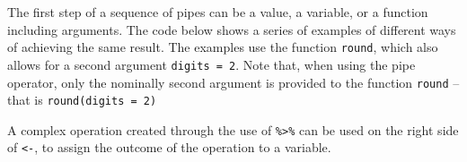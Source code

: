 \documentclass[
]{book}
\newenvironment{Shaded}{\begin{snugshade}}{\end{snugshade}}
\newcommand{\CommentTok}[1]{\textcolor[rgb]{0.56,0.35,0.01}{\textit{#1}}}
\newcommand{\DataTypeTok}[1]{\textcolor[rgb]{0.13,0.29,0.53}{#1}}
\newcommand{\DecValTok}[1]{\textcolor[rgb]{0.00,0.00,0.81}{#1}}
\newcommand{\KeywordTok}[1]{\textcolor[rgb]{0.13,0.29,0.53}{\textbf{#1}}}
\newcommand{\NormalTok}[1]{#1}
\newcommand{\OperatorTok}[1]{\textcolor[rgb]{0.81,0.36,0.00}{\textbf{#1}}}
\newcommand{\StringTok}[1]{\textcolor[rgb]{0.31,0.60,0.02}{#1}}
\begin{document}
The first step of a sequence of pipes can be a value, a variable, or a function including arguments. The code below shows a series of examples of different ways of achieving the same result. The examples use the function \texttt{round}, which also allows for a second argument \texttt{digits\ =\ 2}. Note that, when using the pipe operator, only the nominally second argument is provided to the function \texttt{round} -- that is \texttt{round(digits\ =\ 2)}

\begin{Shaded}
\end{Shaded}

A complex operation created through the use of \texttt{\%\textgreater{}\%} can be used on the right side of \texttt{\textless{}-}, to assign the outcome of the operation to a variable.

\begin{Shaded}
\end{Shaded}
\end{document}
